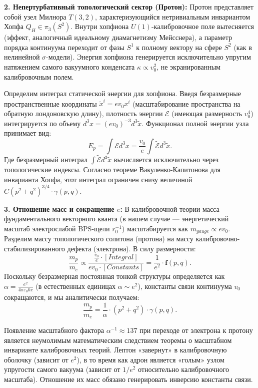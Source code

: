 \documentclass[11pt,a4paper]{article}
\begin{document}
\textbf{2. Непертурбативный топологический сектор (Протон):}
Протон представляет собой узел Милнора $T(3,2)$, характеризующийся нетривиальным инвариантом Хопфа $Q_H \in \pi_3(S^2)$. 
Внутри хопфиона $U(1)$-калибровочное поле вытесняется (эффект, аналогичный идеальному диамагнетизму Мейсснера), а параметр порядка континуума переходит от фазы $S^1$ к полному вектору на сфере $S^2$ (как в нелинейной $\sigma$-модели). Энергия хопфиона генерируется исключительно упругим натяжением самого вакуумного конденсата $\kappa \propto v_0^2$, не экранированным калибровочным полем.

Определим интеграл статической энергии для хопфиона. Введя безразмерные пространственные координаты $\tilde{x}^i = e v_0 x^i$ (масштабирование пространства на обратную лондоновскую длину), плотность энергии $\mathcal{E}$ (имеющая размерность $v_0^4$) интегрируется по объему $d^3x = (e v_0)^{-3} d^3\tilde{x}$.
Функционал полной энергии узла принимает вид:
\begin{equation}
	E_p = \int \mathcal{E} d^3x = \frac{v_0}{e} \int \tilde{\mathcal{E}} d^3\tilde{x}.
\end{equation}
Где безразмерный интеграл $\int \tilde{\mathcal{E}} d^3\tilde{x}$ вычисляется исключительно через топологические индексы. Согласно теореме Вакуленко-Капитонова для инварианта Хопфа, этот интеграл ограничен снизу величиной $C (p^2+q^2)^{3/4} \cdot \gamma(p,q)$.

\textbf{3. Отношение масс и сокращение $e$:}
В калибровочной теории масса фундаментального векторного кванта (в нашем случае — энергетический масштаб электрослабой BPS-щели $r_0^{-1}$) масштабируется как $m_{gauge} \propto e v_0$.
Разделим массу топологического солитона (протона) на массу калибровочно-стабилизированного дефекта (электрона). В силу размерности:
\begin{equation}
	\frac{m_p}{m_e} \propto \frac{\frac{v_0}{e} \cdot [Integral]}{e v_0 \cdot [Constants]} = \frac{1}{e^2} \cdot \mathbf{f}(p,q).
\end{equation}
Поскольку безразмерная постоянная тонкой структуры определяется как $\alpha = \frac{e^2}{4\pi\varepsilon_0 \hbar c}$ (в естественных единицах $\alpha \sim e^2$), константы связи континуума $v_0$ сокращаются, и мы аналитически получаем:
\begin{equation}
	\frac{m_p}{m_e} = \frac{1}{\alpha} \cdot (p^2+q^2) \cdot \gamma(p,q).
\end{equation}

Появление масштабного фактора $\alpha^{-1} \approx 137$ при переходе от электрона к протону является неумолимым математическим следствием теоремы о масштабном инварианте калибровочных теорий. Лептон «завернут» в калибровочную оболочку (зависит от $e^2$), в то время как адрон является «голым» узлом упругости самого вакуума (зависит от $1/e^2$ относительно калибровочного масштаба). Отношение их масс обязано генерировать инверсию константы связи.
	
\end{document}

